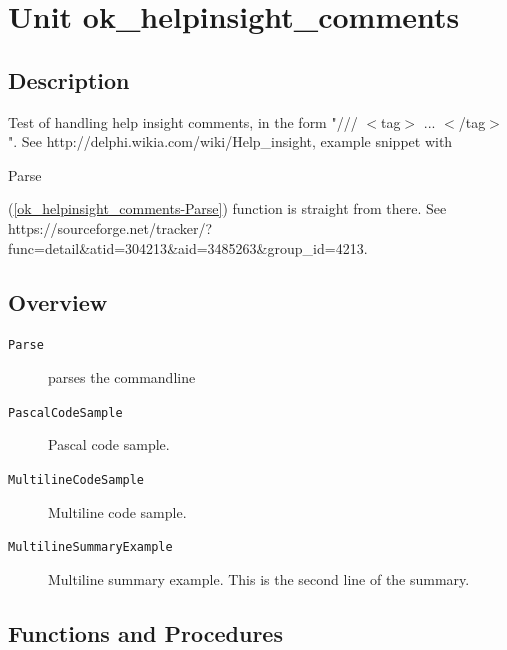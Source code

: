 \documentclass{report}
\begin{document}
\newlength{\tmplength}
\chapter{Unit ok{\_}helpinsight{\_}comments}
\section{Description}
Test of handling help insight comments, in the form "/// {$<$}tag{$>$} ... {$<$}/tag{$>$}". See http://delphi.wikia.com/wiki/Help{\_}insight, example snippet with \begin{ttfamily}Parse\end{ttfamily}(\ref{ok_helpinsight_comments-Parse}) function is straight from there. See https://sourceforge.net/tracker/?func=detail{\&}atid=304213{\&}aid=3485263{\&}group{\_}id=4213.
\section{Overview}
\begin{description}
\item[\texttt{Parse}]parses the commandline
\item[\texttt{PascalCodeSample}]Pascal code sample.
\item[\texttt{MultilineCodeSample}]Multiline code sample.
\item[\texttt{MultilineSummaryExample}] Multiline summary example. This is the second line of the summary. 
\end{description}
\section{Functions and Procedures}
\end{document}
